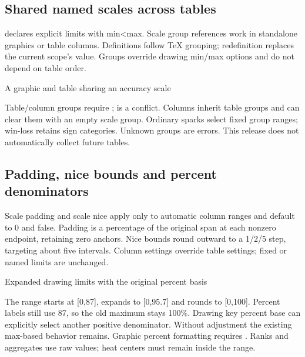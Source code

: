 \subsection{Shared named scales across tables}
 declares explicit limits with min<max.
Scale group references work in standalone graphics or table columns. Definitions
follow TeX grouping; redefinition replaces the current scope's value. Groups
override drawing min/max options and do not depend on table order.
\begin{demo}{A graphic and table sharing an accuracy scale}

\begin{center}
\begin{gradtable}[align=c,header align=c,style=academic,theme=violet,width=\linewidth]
\end{gradtable}
\end{center}
\end{demo}
Table/column groups require ;  is a conflict. Columns
inherit table groups and can clear them with an empty scale group. Ordinary
sparks select fixed group ranges; win-loss retains sign categories. Unknown
groups are errors. This release does not automatically collect future tables.
\subsection{Padding, nice bounds and percent denominators}
Scale padding and scale nice apply only to automatic column ranges and default
to 0 and false. Padding is a percentage of the original span at each nonzero
endpoint, retaining zero anchors. Nice bounds round outward to a 1/2/5 step,
targeting about five intervals. Column settings override table settings; fixed
or named limits are unchanged.
\begin{demo}{Expanded drawing limits with the original percent basis}
\begin{center}
\begin{gradtable}[align=c,header align=c,style=compact,theme=forest,width=\linewidth,
  scale=column,scale padding=10,scale nice=true]
\end{gradtable}
\end{center}
\end{demo}
The range starts at [0,87], expands to [0,95.7] and rounds to [0,100]. Percent
labels still use 87, so the old maximum stays 100\%. Drawing key percent base
can explicitly select another positive denominator. Without adjustment the
existing max-based behavior remains. Graphic percent formatting requires .
Ranks and aggregates use raw values; heat centers must remain inside the range.
